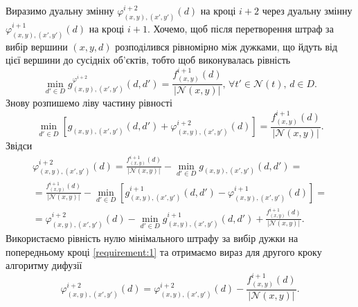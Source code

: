Виразимо дуальну змінну
$\varphi_{\left(x, y \right), \left(x', y' \right)}^{i + 2} \left( d \right)$
на кроці $i + 2$ через дуальну змінну
$\varphi_{\left(x, y \right), \left(x', y' \right)}^{i + 1} \left( d \right)$
на кроці $i + 1$.
Хочемо, щоб після перетворення штраф за вибір вершини $\left(x, y, d \right)$
розподілився рівномірно між дужками,
що йдуть від цієї вершини до сусідніх об'єктів, тобто щоб виконувалась рівність
\begin{equation*}
    \min \limits_{d' \in D} g_{\left(x, y \right), \left(x', y' \right)}^{\varphi^{i + 2}}
    \left(
        d, d'
    \right) =
    \frac{f_{\left(x, y \right)}^{i + 1} \left(d \right)}{\left| \mathcal{N} \left( x, y \right) \right|}, \,
    \forall t' \in \mathcal{N} \left(t \right), \,
    d \in D.
\end{equation*}
Знову розпишемо ліву частину рівності
\begin{equation*}
    \min \limits_{d' \in D} \left[
        g_{\left(x, y \right), \left(x', y' \right)} \left( d, d' \right) +
        \varphi_{\left(x, y \right), \left(x', y' \right)}^{i + 2} \left(d \right)
    \right] =
    \frac{f_{\left(x, y \right)}^{i + 1} \left(d \right)}{\left| \mathcal{N} \left( x, y \right) \right|}.
\end{equation*}
Звідси
\begin{equation*}
\begin{gathered}
    \varphi_{\left(x, y \right), \left(x', y' \right)}^{i + 2} \left(d \right) =
    \frac{f_{\left(x, y \right)}^{i + 1} \left(d \right)}{\left| \mathcal{N} \left( x, y \right) \right|} -
    \min \limits_{d' \in D}
        g_{\left(x, y \right), \left(x', y' \right)} \left( d, d' \right) = \\
    = \frac{f_{\left(x, y \right)}^{i + 1} \left(d \right)}{\left| \mathcal{N} \left( x, y \right) \right|} -
    \min \limits_{d' \in D} \left[
        g_{\left(x, y \right), \left(x', y' \right)}^{i + 1} \left( d, d' \right) -
        \varphi_{\left(x, y \right), \left(x', y' \right)}^{i + 1} \left(d \right)
    \right] = \\
    = \varphi_{\left(x, y \right), \left(x', y' \right)}^{i + 2} \left(d \right) -
    \min \limits_{d' \in D}
        g_{\left(x, y \right), \left(x', y' \right)}^{i + 1} \left( d, d' \right) +
    \frac{f_{\left(x, y \right)}^{i + 1} \left(d \right)}{\left| \mathcal{N} \left( x, y \right) \right|}.
\end{gathered}
\end{equation*}
Використаємо рівність нулю
мінімального штрафу за вибір дужки на попередньому кроці \eqref{requirement:1}
та отримаємо вираз для другого кроку алгоритму дифузії
\begin{equation*}
    \varphi_{\left(x, y \right), \left(x', y' \right)}^{i + 2} \left(d \right) =
    \varphi_{\left(x, y \right), \left(x', y' \right)}^{i + 2} \left(d \right) -
    \frac{f_{\left(x, y \right)}^{i + 1} \left(d \right)}{\left| \mathcal{N} \left( x, y \right) \right|}.
\end{equation*}

